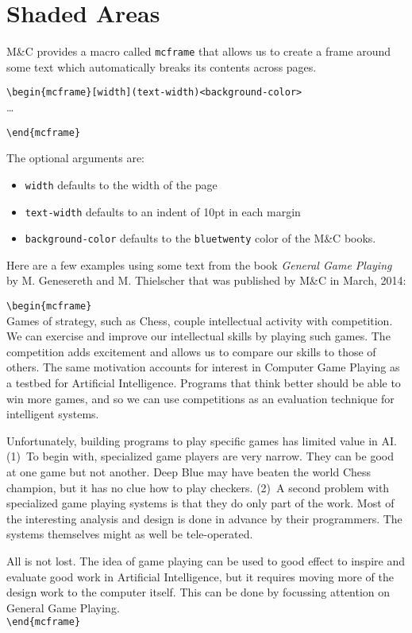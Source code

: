 

\chapter{Shaded Areas}
\label{ch04}

M\&C provides a macro called \verb+mcframe+ that allows us to
create a frame around some text which automatically breaks its contents
across pages. 

\verb+\begin{mcframe}[width](text-width)<background-color>+\\

\ldots

\verb+\end{mcframe}+

The optional arguments are:
\begin{itemize}
\item
\verb+width+ defaults to the width of the page
\item
\verb+text-width+ defaults to an indent of 10pt in each margin
\item
\verb+background-color+ defaults to the \verb+bluetwenty+ color of the
	M\&C books.
\end{itemize}

\blankline
Here are a few examples using some text from the book \textit{General Game 
Playing} by M. Genesereth and M. Thielscher that was published by M\&C in 
March, 2014:

\begin{mcframe}
\verb+\begin{mcframe}+\\
Games of strategy, such as Chess, couple intellectual activity with
competition.
We can exercise and improve our intellectual skills by playing such games.
The competition adds excitement and allows us to
compare our skills to those of others.
The same motivation accounts for
interest in Computer Game Playing as a testbed for Artificial Intelligence.
Programs that think better should be able to win more
games, and so we can use competitions as an evaluation technique for
intelligent systems.

Unfortunately, building programs to play specific games has limited
value in AI.  (1)~To begin with, specialized game players are very narrow.
They can be good at one game but not another. Deep Blue may have beaten
the world Chess champion, but it has no clue how to play checkers.  (2)~A
second problem with specialized game playing systems is that they do only
part of the work. Most of the interesting analysis and design is done in
advance by their programmers. The systems themselves might as well be
tele-operated.

All is not lost. The idea of game playing can be used to good effect
to inspire and evaluate good work in Artificial Intelligence, but it
requires moving more of the design work to the computer itself.
This can be done by focussing attention on General Game Playing.\\
\verb+\end{mcframe}+
\end{mcframe}

